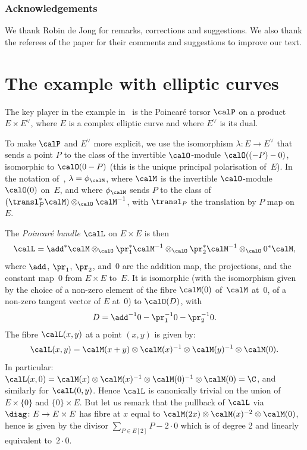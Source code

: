 \subsubsection*{Acknowledgements}
We thank Robin de Jong for remarks, corrections and suggestions. We
also thank the referees of the paper for their comments and
suggestions to improve our text.

\section{The example with elliptic curves}\label{sec2}
The key player in the example in~\cite{Bertrand11} is the Poincaré
torsor $\calP$ on a product $E\times E^\vee$, where $E$ is a complex
elliptic curve and where $E^\vee$ is its dual.

To make $\calP$ and $E^\vee$ more explicit, we use the isomorphism
$\lambda\colon E \to E^\vee$ that sends a point $P$ to the class of
the invertible $\calO$-module $\calO((-P)-0)$, isomorphic to
$\calO(0-P)$ (this is the unique principal polarisation of~$E$). In
the notation of~\cite[\S 6]{MumfordAV}, $\lambda=\phi_\calM$,
where $\calM$ is the invertible $\calO$-module $\calO(0)$ on~$E$, and
where $\phi_\calM$ sends $P$ to the class of
$(\transl_P^*\calM)\otimes_\calO\calM^{-1}$, with $\transl_P$ the
translation by $P$ map on~$E$.

The \emph{Poincaré bundle} $\calL$ on $E\times E$ is then
\begin{equation}\label{eqn:defPbundle}
\calL =
\add^*\calM\otimes_\calO\pr_1^*\calM^{-1}\otimes_\calO\pr_2^*\calM^{-1}\otimes_\calO0^*\calM,
\end{equation}
where $\add$, $\pr_1$, $\pr_2$, and~$0$ are the addition map, the
projections, and the constant map~$0$ from $E\times E$ to~$E$. It is
isomorphic (with the isomorphism given by the choice of a non-zero
element of the fibre $\calM(0)$ of~$\calM$ at~$0$, \ie of a non-zero
tangent vector of $E$ at~$0$) to $\calO(D)$, with
\begin{equation}\label{eqn:defD}
D=\add^{-1}0-\pr_1^{-1}0-\pr_2^{-1}0.
\end{equation}
The fibre $\calL(x,y)$ at a point $(x,y)$ is given by:
\begin{equation}\label{eqn:fibresPbundle}
\calL(x,y) =
\calM(x+y)\otimes\calM(x)^{-1}\otimes\calM(y)^{-1}\otimes\calM(0).
\end{equation}
In particular:
$\calL(x,0)=\calM(x)\otimes\calM(x)^{-1}\otimes\calM(0)^{-1}\otimes\calM(0)=\C$,
and similarly for $\calL(0,y)$. Hence $\calL$ is canonically trivial on the union of
$E\times\{0\}$ and $\{0\}\times E$. But let us remark that the
pullback of $\calL$ via $\diag\colon E\to E\times E$ has fibre at $x$
equal to $\calM(2x)\otimes\calM(x)^{-2}\otimes\calM(0)$, hence is
given by the divisor $\sum_{P\in E[2]}P - 2{\cdot}0$ which is of degree
2 and linearly equivalent to~$2{\cdot}0$.

